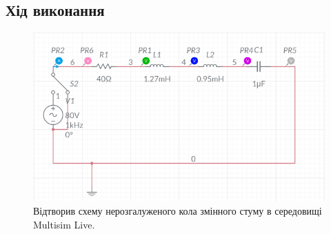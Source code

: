 \documentclass{article}
\begin{document}
\begin{normalsize}
	\section*{Хід виконання}
	\begin{figure}[H]
		\centering
		\includegraphics[scale=0.5]{s}
		\caption{Відтворив схему нерозгалуженого кола змінного стуму в середовищі Multisim Live.}
	\end{figure}
	

\end{normalsize}
\end{document}
